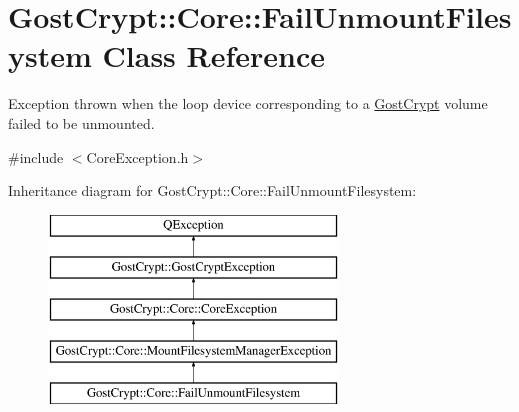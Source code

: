 \hypertarget{class_gost_crypt_1_1_core_1_1_fail_unmount_filesystem}{}\section{Gost\+Crypt\+:\+:Core\+:\+:Fail\+Unmount\+Filesystem Class Reference}
\label{class_gost_crypt_1_1_core_1_1_fail_unmount_filesystem}


Exception thrown when the loop device corresponding to a \hyperlink{namespace_gost_crypt}{Gost\+Crypt} volume failed to be unmounted.  




{\ttfamily \#include $<$Core\+Exception.\+h$>$}

Inheritance diagram for Gost\+Crypt\+:\+:Core\+:\+:Fail\+Unmount\+Filesystem\+:\begin{figure}[H]
\begin{center}
\leavevmode
\includegraphics[height=5.000000cm]{class_gost_crypt_1_1_core_1_1_fail_unmount_filesystem}
\end{center}
\end{figure}
